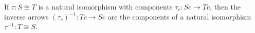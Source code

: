 If $\tau: S \cong T$ is a natural isomorphism with components $\tau_c: Sc \rightarrow Tc$, then the inverse arrows $(\tau_c)^{-1}: Tc \rightarrow Sc$ are the components of a natural isomorphism $\tau^{-1}: T \cong S$.